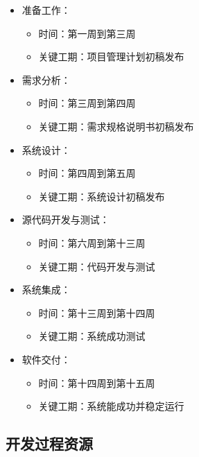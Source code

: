 \documentclass[
  hyperref, a4paper]{ctexart}
\providecommand{\tightlist}{%
  \setlength{\itemsep}{0pt}\setlength{\parskip}{0pt}}
\begin{document}
\begin{itemize}
\tightlist
\item
  准备工作：

  \begin{itemize}
  \tightlist
  \item
    时间：第一周到第三周
  \item
    关键工期：项目管理计划初稿发布
  \end{itemize}
\item
  需求分析：

  \begin{itemize}
  \tightlist
  \item
    时间：第三周到第四周
  \item
    关键工期：需求规格说明书初稿发布
  \end{itemize}
\item
  系统设计：

  \begin{itemize}
  \tightlist
  \item
    时间：第四周到第五周
  \item
    关键工期：系统设计初稿发布
  \end{itemize}
\item
  源代码开发与测试：

  \begin{itemize}
  \tightlist
  \item
    时间：第六周到第十三周
  \item
    关键工期：代码开发与测试
  \end{itemize}
\item
  系统集成：

  \begin{itemize}
  \tightlist
  \item
    时间：第十三周到第十四周
  \item
    关键工期：系统成功测试
  \end{itemize}
\item
  软件交付：

  \begin{itemize}
  \tightlist
  \item
    时间：第十四周到第十五周
  \item
    关键工期：系统能成功并稳定运行
  \end{itemize}
\end{itemize}

\hypertarget{ux5f00ux53d1ux8fc7ux7a0bux8d44ux6e90}{%
\subsection{开发过程资源}\label{ux5f00ux53d1ux8fc7ux7a0bux8d44ux6e90}}
\end{document}
